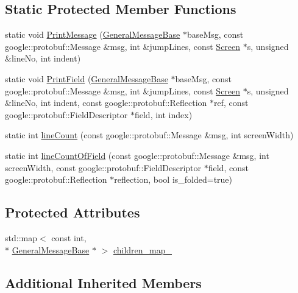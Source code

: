 \subsection*{Static Protected Member Functions}
\begin{DoxyCompactItemize}
\item 
static void \hyperlink{classGeneralMessageBase_acb22b24b458fbb199de702736e136be3}{Print\-Message} (\hyperlink{classGeneralMessageBase}{General\-Message\-Base} $\ast$base\-Msg, const google\-::protobuf\-::\-Message \&msg, int \&jump\-Lines, const \hyperlink{classScreen}{Screen} $\ast$s, unsigned \&line\-No, int indent)
\item 
static void \hyperlink{classGeneralMessageBase_abb2b6d5c8a9399cc6e3eab14a0bec0c7}{Print\-Field} (\hyperlink{classGeneralMessageBase}{General\-Message\-Base} $\ast$base\-Msg, const google\-::protobuf\-::\-Message \&msg, int \&jump\-Lines, const \hyperlink{classScreen}{Screen} $\ast$s, unsigned \&line\-No, int indent, const google\-::protobuf\-::\-Reflection $\ast$ref, const google\-::protobuf\-::\-Field\-Descriptor $\ast$field, int index)
\item 
static int \hyperlink{classGeneralMessageBase_a3b3feba460a716d68348a54d274dd675}{line\-Count} (const google\-::protobuf\-::\-Message \&msg, int screen\-Width)
\item 
static int \hyperlink{classGeneralMessageBase_a4af9e501c26db8741b458ab477fe9aaa}{line\-Count\-Of\-Field} (const google\-::protobuf\-::\-Message \&msg, int screen\-Width, const google\-::protobuf\-::\-Field\-Descriptor $\ast$field, const google\-::protobuf\-::\-Reflection $\ast$reflection, bool is\-\_\-folded=true)
\end{DoxyCompactItemize}
\subsection*{Protected Attributes}
\begin{DoxyCompactItemize}
\item 
std\-::map$<$ const int, \\*
\hyperlink{classGeneralMessageBase}{General\-Message\-Base} $\ast$ $>$ \hyperlink{classGeneralMessageBase_a5ff98bf477e95204ca2021be372d3eba}{children\-\_\-map\-\_\-}
\end{DoxyCompactItemize}
\subsection*{Additional Inherited Members}


